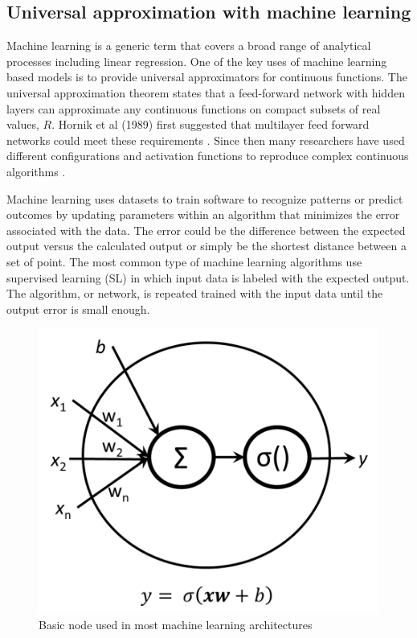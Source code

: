 \documentclass[twoside,twocolumn]{article}
\begin{document}
\subsection{Universal approximation with machine learning}

Machine learning is a generic term that covers a broad range of analytical processes including linear regression. One of the key uses of machine learning based models is to provide universal approximators for continuous functions. The universal approximation theorem states that a feed-forward network with hidden layers can approximate any continuous functions on compact subsets of real values, $R$. Hornik et al (1989) first suggested that multilayer feed forward networks could meet these requirements \cite{Hornik1989}. Since then many researchers have used different configurations and activation functions to reproduce complex continuous algorithms \cite{Mhaskar2016,Hanin2017, Segol2019}.

Machine learning uses datasets to train software to recognize patterns or predict outcomes by updating parameters within an algorithm that minimizes the error associated with the data. The error could be the difference between the expected output versus the calculated output or simply be the shortest distance between a set of point. The most common type of machine learning algorithms use supervised learning (SL) in which input data is labeled with the expected output. The algorithm, or network, is repeated trained with the input data until the output error is small enough.

\begin{figure}[!h]
	\centering
	\includegraphics[width=.7\columnwidth]{images/node.png}  %
	\caption{Basic node used in most machine learning architectures }
	\label{fig:node}
\end{figure}
\end{document}
